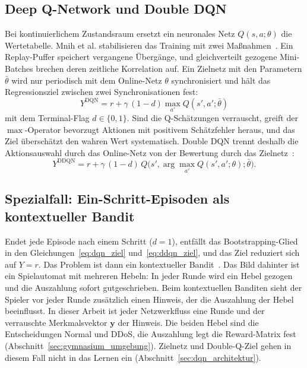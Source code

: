 \subsection{Deep Q-Network und Double DQN}
Bei kontinuierlichem Zustandsraum ersetzt ein neuronales Netz $Q(s,a;\theta)$ die Wertetabelle. Mnih et al. stabilisieren das Training mit zwei Maßnahmen~\autocite{mnihHumanlevelControlDeep2015}. Ein Replay-Puffer speichert vergangene Übergänge, und gleichverteilt gezogene Mini-Batches brechen deren zeitliche Korrelation auf. Ein Zielnetz mit den Parametern $\bar\theta$ wird nur periodisch mit dem Online-Netz $\theta$ synchronisiert und hält das Regressionsziel zwischen zwei Synchronisationen fest:
\begin{equation}
	Y^{\mathrm{DQN}}=r+\gamma\,(1-d)\max_{a'}Q(s',a';\bar\theta)
	\label{eq:dqn_ziel}
\end{equation}
mit dem Terminal-Flag $d\in\{0,1\}$. Sind die Q-Schätzungen verrauscht, greift der $\max$-Operator bevorzugt Aktionen mit positivem Schätzfehler heraus, und das Ziel überschätzt den wahren Wert systematisch. Double DQN trennt deshalb die Aktionsauswahl durch das Online-Netz von der Bewertung durch das Zielnetz~\autocite{vanhasseltDeepReinforcementLearning2016}:
\begin{equation}
	Y^{\mathrm{DDQN}}=r+\gamma\,(1-d)\,Q\bigl(s',\arg\max_{a'}Q(s',a';\theta);\bar\theta\bigr).
	\label{eq:ddqn_ziel}
\end{equation}

\subsection{Spezialfall: Ein-Schritt-Episoden als kontextueller Bandit}
Endet jede Episode nach einem Schritt ($d=1$), entfällt das Bootstrapping-Glied in den Gleichungen~\eqref{eq:dqn_ziel} und~\eqref{eq:ddqn_ziel}, und das Ziel reduziert sich auf $Y=r$. Das Problem ist dann ein kontextueller Bandit~\autocite{suttonReinforcementLearningIntroduction2018}. Das Bild dahinter ist ein Spielautomat mit mehreren Hebeln: In jeder Runde wird ein Hebel gezogen und die Auszahlung sofort gutgeschrieben. Beim kontextuellen Banditen sieht der Spieler vor jeder Runde zusätzlich einen Hinweis, der die Auszahlung der Hebel beeinflusst. In dieser Arbeit ist jeder Netzwerkfluss eine Runde und der verrauschte Merkmalsvektor $\mathbf{y}$ der Hinweis. Die beiden Hebel sind die Entscheidungen Normal und DDoS, die Auszahlung legt die Reward-Matrix fest (Abschnitt~\ref{sec:gymnasium_umgebung}). Zielnetz und Double-Q-Ziel gehen in diesem Fall nicht in das Lernen ein (Abschnitt~\ref{sec:dqn_architektur}).